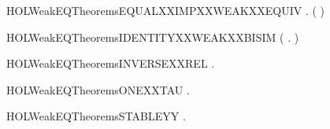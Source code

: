 \newcommand{\HOLWeakEQTheoremsEPSXXWEAKXXEPS}{\UseVerbatim{HOLWeakEQTheoremsEPSXXWEAKXXEPS}}
\begin{SaveVerbatim}{HOLWeakEQTheoremsEQUALXXIMPXXWEAKXXEQUIV}
\HOLTokenTurnstile{} \HOLSymConst{\HOLTokenForall{}} . ( \HOLSymConst{=} ) \HOLSymConst{\HOLTokenImp{}}   
\end{SaveVerbatim}
\newcommand{\HOLWeakEQTheoremsEQUALXXIMPXXWEAKXXEQUIV}{\UseVerbatim{HOLWeakEQTheoremsEQUALXXIMPXXWEAKXXEQUIV}}
\begin{SaveVerbatim}{HOLWeakEQTheoremsIDENTITYXXWEAKXXBISIM}
\HOLTokenTurnstile{}  (\HOLTokenLambda{} .  \HOLSymConst{=} )
\end{SaveVerbatim}
\newcommand{\HOLWeakEQTheoremsIDENTITYXXWEAKXXBISIM}{\UseVerbatim{HOLWeakEQTheoremsIDENTITYXXWEAKXXBISIM}}
\begin{SaveVerbatim}{HOLWeakEQTheoremsINVERSEXXREL}
\HOLTokenTurnstile{} \HOLSymConst{\HOLTokenForall{}}  .     \HOLSymConst{\HOLTokenEquiv{}}   
\end{SaveVerbatim}
\newcommand{\HOLWeakEQTheoremsINVERSEXXREL}{\UseVerbatim{HOLWeakEQTheoremsINVERSEXXREL}}
\begin{SaveVerbatim}{HOLWeakEQTheoremsONEXXTAU}
\HOLTokenTurnstile{} \HOLSymConst{\HOLTokenForall{}} .  \HOLTokenTransBegin\HOLConst{\ensuremath{\tau}}\HOLTokenTransEnd {} \HOLSymConst{\HOLTokenImp{}}   
\end{SaveVerbatim}
\newcommand{\HOLWeakEQTheoremsONEXXTAU}{\UseVerbatim{HOLWeakEQTheoremsONEXXTAU}}
\begin{SaveVerbatim}{HOLWeakEQTheoremsSTABLEYY}
\HOLTokenTurnstile{}   \HOLSymConst{\HOLTokenEquiv{}} \HOLSymConst{\HOLTokenForall{}} .  \HOLTokenTransBegin{}\HOLTokenTransEnd {} \HOLSymConst{\HOLTokenImp{}}  \HOLSymConst{\HOLTokenNotEqual{}} \HOLConst{\ensuremath{\tau}}
\end{SaveVerbatim}
\newcommand{\HOLWeakEQTheoremsSTABLEYY}{\UseVerbatim{HOLWeakEQTheoremsSTABLEYY}}
